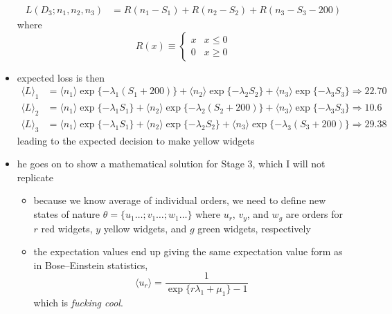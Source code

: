 \documentclass[../jaynes_prob_theory_notes.tex]{subfiles}
\begin{document}
\begin{itemize}
\begin{align*}
                                L(D_3; n_1, n_2, n_3) &= R(n_1 - S_1) + R(n_2 - S_2) + R(n_3 - S_3 - 200)
                            \end{align*}
                            where
                            \begin{equation*} 
                                R(x) \equiv \left \{ \begin{matrix} x & x \leq 0 \\ 0 & x \geq 0 \end{matrix} \right.
                            \end{equation*}
                        \item expected loss is then
                            \begin{align*} 
                                {\langle L \rangle}_1 &= \langle n_1 \rangle \exp \{-\lambda_1 (S_1 + 200) \} + \langle n_2 \rangle \exp \{-\lambda_2 S_2 \} + \langle n_3 \rangle \exp \{-\lambda_3 S_3 \} \Rightarrow 22.70 \\
                                {\langle L \rangle}_2 &= \langle n_1 \rangle \exp \{-\lambda_1 S_1 \} + \langle n_2 \rangle \exp \{-\lambda_2(S_2 + 200) \} + \langle n_3 \rangle \exp \{-\lambda_3 S_3\} \Rightarrow 10.6 \\
                                {\langle L \rangle}_3 &= \langle n_1 \rangle \exp \{-\lambda_1 S_1 \} + \langle n_2 \rangle \exp \{ -\lambda_2S_2\} + \langle n_3 \rangle \exp \{-\lambda_3(S_3 + 200)\} \Rightarrow 29.38
                            \end{align*}
                            leading to the expected decision to make yellow widgets
                        \item he goes on to show a mathematical solution for Stage 3, which I will not replicate 
                            \begin{itemize}
                                \item because we know average of individual orders, we need to define new states of nature \(\theta = \{u_1 \ldots; v_1 \ldots; w_1 \ldots \}\) where \(u_r\), \(v_y\), and \(w_g\) are orders for \(r\) red widgets, \(y\) yellow widgets, and \(g\) green widgets, respectively
                                \item the expectation values end up giving the same expectation value form as in Bose--Einstein statistics,
                                    \begin{equation*} 
                                        \langle u_r \rangle = \frac{1}{\exp \{ r\lambda_1 + \mu_1\} - 1}
                                    \end{equation*}
                                    which is \textit{fucking cool}.
                            \end{itemize}
                    \end{itemize}
\end{document}
